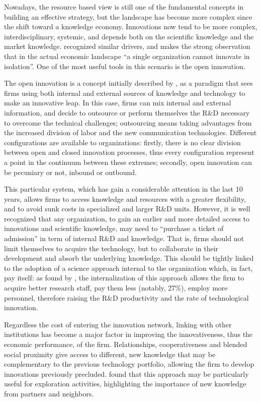 Nowadays, the resource based view is still one of the fundamental concepts in building an effective strategy, but the landscape has become more complex since the shift toward a knowledge economy. Innovations now tend to be more complex, interdisciplinary, systemic, and depends both on the scientific knowledge and the market knowledge. \citet{Dahlander2010} recognized similar drivers, and makes the strong observation that in the actual economic landscape \enquote{a single organization cannot innovate in isolation}. One of the most useful tools in this scenario is the open innovation.

The open innovation is a concept initially described by \citet{Chesbrough2003}, as a paradigm that sees firms using both internal and external sources of knowledge and technology to make an innovative leap. In this case, firms can mix internal and external information, and decide to outsource or perform themselves the R\&D necessary to overcome the technical challenges; outsourcing  means taking advantages from the increased division of labor and the new communication technologies. Different configurations are available to organizations: firstly, there is no clear division between open and closed innovation processes, thus every configuration represent a point in the continuum between these extremes; secondly, open innovation can be pecuniary or not, inbound or outbound. 

This particular system, which has gain a considerable attention in the last 10 years, allows firms to access knowledge and resources with a greater flexibility, and to avoid sunk costs in specialized and larger R\&D units. However, it is well recognized that any organization, to gain an earlier and more detailed access to innovations and scientific knowledge, may need to \enquote{purchase a ticket of admission} in term of internal R\&D and knowledge. That is, firms should not limit themselves to acquire the technology, but to collaborate in their development and absorb the underlying knowledge. This should be tightly linked to the adoption of a science approach internal to the organization which, in fact, pay itself: as found by \citet{Stern2004}, the internalization of this approach allows the firm to acquire better research staff, pay them less (notably, 27\%), employ more personnel, therefore raising the R\&D productivity and the rate of technological innovation. 

Regardless the cost of entering the innovation network, linking with other institutions has become a major factor in improving the innovativeness, thus the economic performance, of the firm. Relationships, cooperativeness and blended social proximity give access to different, new knowledge that may be complementary to the previous technology portfolio, allowing the firm to develop innovations previously precluded. \citet{Bercovitz2006} found that this approach may be particularly useful for exploration activities, highlighting the importance of new knowledge from partners and neighbors.

